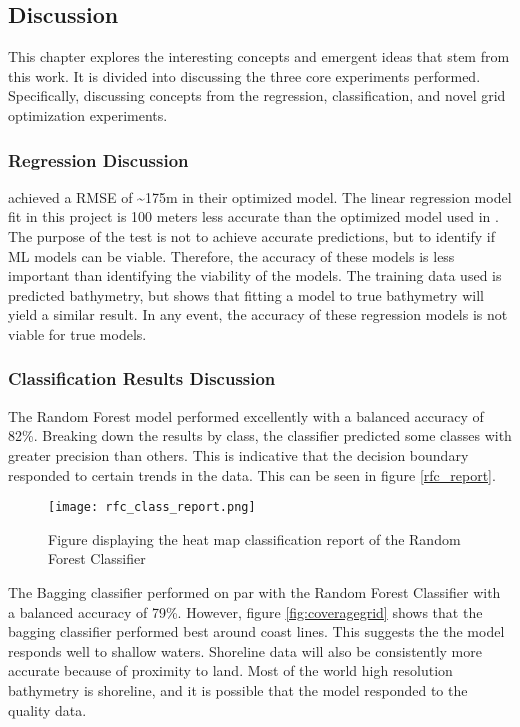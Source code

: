 \subsection{Discussion}
\setlength{\parindent}{10ex}
This chapter explores the interesting concepts and emergent ideas that stem from this work.
It is divided into discussing the three core experiments performed.
Specifically, discussing concepts from the regression, classification, and novel grid optimization experiments.

\subsubsection{Regression Discussion}
\cite{jena2012prediction} achieved a \ac{RMSE} of \~{}175m in their optimized model.
The linear regression model fit in this project is 100 meters less accurate than the optimized model used in \cite{jena2012prediction}.
The purpose of the test is not to achieve accurate predictions, but to identify if \ac{ML} models can be viable.
Therefore, the accuracy of these models is less important than identifying the viability of the models.
The training data used is predicted bathymetry, but shows that fitting a model to true bathymetry will yield a similar result.
In any event, the accuracy of these regression models is not viable for true models.

\subsubsection{Classification Results Discussion}
The Random Forest model performed excellently with a balanced accuracy of 82\%.
Breaking down the results by class, the classifier predicted some classes with greater precision than others.
This is indicative that the decision boundary responded to certain trends in the data.
This can be seen in figure \ref{rfc_report}.

\begin{figure}[h]
    \centering
    \texttt{[image: rfc\_class\_report.png]}
    \caption{Figure displaying the heat map classification report of the Random Forest Classifier}
    \label{fig:rfc_report}
\end{figure}

\par
The Bagging classifier performed on par with the Random Forest Classifier with a balanced accuracy of 79\%.
However, figure \ref{fig:coveragegrid} shows that the bagging classifier performed best around coast lines.
This suggests the the model responds well to shallow waters.
Shoreline data will also be consistently more accurate because of proximity to land.
Most of the world high resolution bathymetry is shoreline, and it is possible that the model responded to the quality data.


